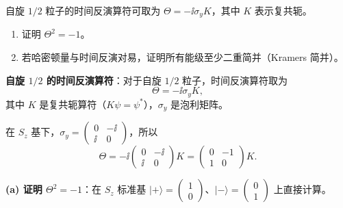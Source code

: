 \begin{question}
自旋 $1/2$ 粒子的时间反演算符可取为 $\Theta=-\ii\sigma_yK$，其中 $K$ 表示复共轭。
\begin{enumerate}
\item 证明 $\Theta^2=-1$。
\item 若哈密顿量与时间反演对易，证明所有能级至少二重简并（Kramers 简并）。
\end{enumerate}
\end{question}
\begin{solution}
	\textbf{自旋 $1/2$ 的时间反演算符}：对于自旋 $1/2$ 粒子，时间反演算符取为
	\[
	\Theta = -\ii\sigma_y K,
	\]
	其中 $K$ 是复共轭算符（$K\psi=\psi^*$），$\sigma_y$ 是泡利矩阵。

	在 $S_z$ 基下，$\sigma_y = \begin{pmatrix}0&-\ii\\\ii&0\end{pmatrix}$，所以
	\[
	\Theta = -\ii\begin{pmatrix}0&-\ii\\\ii&0\end{pmatrix}K
	= \begin{pmatrix}0&-1\\1&0\end{pmatrix}K.
	\]

	\textbf{(a) 证明 $\Theta^2 = -1$}：在 $S_z$ 标准基 $|+\rangle=\begin{pmatrix}1\\0\end{pmatrix}$、$|-\rangle=\begin{pmatrix}0\\1\end{pmatrix}$ 上直接计算。


\end{solution}

